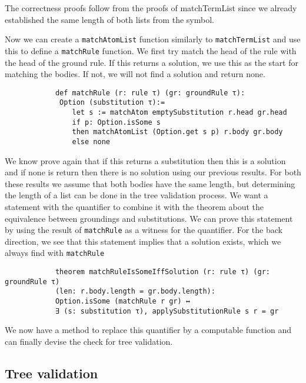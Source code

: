 \documentclass{article}
\begin{document}
        The correctness proofs follow from the proofs of matchTermList since we already established the same length of both lists from the symbol.

        Now we can create a \texttt{matchAtomList} function similarly to \texttt{matchTermList} and use this to define a \texttt{matchRule} function. We first try match the head of the rule with the head of the ground rule. If this returns a solution, we use this as the start for matching the bodies. If not, we will not find a solution and return none.

        \begin{lstlisting}
            def matchRule (r: rule τ) (gr: groundRule τ):
             Option (substitution τ):=
                let s := matchAtom emptySubstitution r.head gr.head
                if p: Option.isSome s
                then matchAtomList (Option.get s p) r.body gr.body
                else none

        \end{lstlisting}

        We know prove again that if this returns a substitution then this is a solution and if none is return then there is no solution using our previous results. For both these results we assume that both bodies have the same length, but determining the length of a list can be done in the tree validation process.
        We want a statement with the quantifier to combine it with the theorem about the equivalence between groundings and substitutions. We can prove this statement by using the result of \texttt{matchRule} as a witness for the quantifier. For the back direction, we see that this statement implies that a solution exists, which we always find with \texttt{matchRule}

        \begin{lstlisting}
            theorem matchRuleIsSomeIffSolution (r: rule τ) (gr: groundRule τ) 
            (len: r.body.length = gr.body.length): 
            Option.isSome (matchRule r gr) ↔ 
            ∃ (s: substitution τ), applySubstitutionRule s r = gr
        \end{lstlisting}

        We now have a method to replace this quantifier by a computable function and can finally devise the check for tree validation.

        \subsection{Tree validation}
\end{document}
